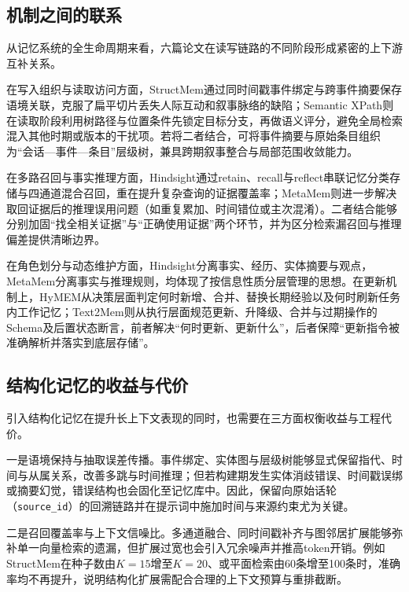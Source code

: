 
\subsection{机制之间的联系}

从记忆系统的全生命周期来看，六篇论文在读写链路的不同阶段形成紧密的上下游互补关系。

在写入组织与读取访问方面，StructMem通过同时间戳事件绑定与跨事件摘要保存语境关联，克服了扁平切片丢失人际互动和叙事脉络的缺陷；Semantic XPath则在读取阶段利用树路径与位置条件先锁定目标分支，再做语义评分，避免全局检索混入其他时期或版本的干扰项。若将二者结合，可将事件摘要与原始条目组织为“会话—事件—条目”层级树，兼具跨期叙事整合与局部范围收敛能力。

在多路召回与事实推理方面，Hindsight通过retain、recall与reflect串联记忆分类存储与四通道混合召回，重在提升复杂查询的证据覆盖率；MetaMem则进一步解决取回证据后的推理误用问题（如重复累加、时间错位或主次混淆）。二者结合能够分别加固“找全相关证据”与“正确使用证据”两个环节，并为区分检索漏召回与推理偏差提供清晰边界。

在角色划分与动态维护方面，Hindsight分离事实、经历、实体摘要与观点，MetaMem分离事实与推理规则，均体现了按信息性质分层管理的思想。在更新机制上，HyMEM从决策层面判定何时新增、合并、替换长期经验以及何时刷新任务内工作记忆；Text2Mem则从执行层面规范更新、升降级、合并与过期操作的Schema及后置状态断言，前者解决“何时更新、更新什么”，后者保障“更新指令被准确解析并落实到底层存储”。

\subsection{结构化记忆的收益与代价}

引入结构化记忆在提升长上下文表现的同时，也需要在三方面权衡收益与工程代价。

一是语境保持与抽取误差传播。事件绑定、实体图与层级树能够显式保留指代、时间与从属关系，改善多跳与时间推理；但若构建期发生实体消歧错误、时间戳误绑或摘要幻觉，错误结构也会固化至记忆库中。因此，保留向原始话轮（\texttt{source\_id}）的回溯链路并在提示词中施加时间与来源约束尤为关键。

二是召回覆盖率与上下文信噪比。多通道融合、同时间戳补齐与图邻居扩展能够弥补单一向量检索的遗漏，但扩展过宽也会引入冗余噪声并推高token开销。例如StructMem在种子数由$K=15$增至$K=20$、或平面检索由60条增至100条时，准确率均不再提升，说明结构化扩展需配合合理的上下文预算与重排截断。

